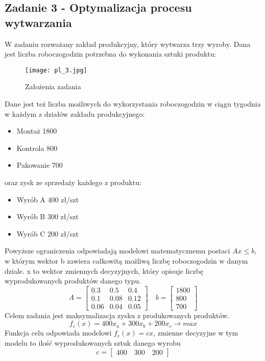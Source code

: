\documentclass[a4paper,15pt]{article}
\begin{document}
\subsection{Zadanie 3 - Optymalizacja procesu wytwarzania}
W zadaniu rozważany zakład produkcyjny, który wytwarza trzy wyroby. Dana jest liczba roboczogodzin potrzebna do wykonania sztuki produktu: \\
\begin{figure}[H]
\centerline{\texttt{[image: pl\_3.jpg]}}
\centering
\caption{Założenia zadania}
\label{fig:pl_3}
\end{figure}
Dane jest też liczba możliwych do wykorzystania roboczogodzin w ciągu tygodnia w każdym z działów zakładu produkcyjnego:
\begin{itemize}
\item Montaż 1800
\item Kontrola 800
\item Pakowanie 700
\end{itemize}
oraz zysk ze sprzedaży każdego z produktu:
\begin{itemize}
\item Wyrób A 400 zł/szt
\item Wyrób B 300 zł/szt
\item Wyrób C 200 zł/szt
\end{itemize}
Powyższe ograniczenia odpowiadają modelowi matematycznemu postaci \( Ax \leq b \), w którym wektor b zawiera całkowitą możliwą liczbę roboczogodzin w danym dziale. x to wektor zmiennych decyzyjnych, który opisuje liczbę wyprodukowanych produktów danego typu.
\begin{equation*}
A=
\begin{bmatrix} 
0.3 & 0.5 & 0.4 \\ 
0.1 & 0.08 & 0.12 \\
0.06 & 0.04 & 0.05  
\end{bmatrix}
\quad 
b=
\begin{bmatrix} 
1800 \\ 
800 \\
700
\end{bmatrix}
\end{equation*}
Celem zadania jest maksymalizacja zysku z produkowanych produktów.
\begin{equation*}
f_{c}(x)= 400x_{a} + 300x_{b} + 200x_{c} \rightarrow max
\end{equation*}
Funkcja celu odpowiada modelowi \( f_{c}(x)=cx \), zmienne decyzyjne w tym modelu to ilość wyprodukowanych sztuk danego wyrobu
\begin{equation*}
c = 
\begin{bmatrix}
400 \quad 300 \quad  200 
\end{bmatrix}
\end{equation*}
\end{document}
